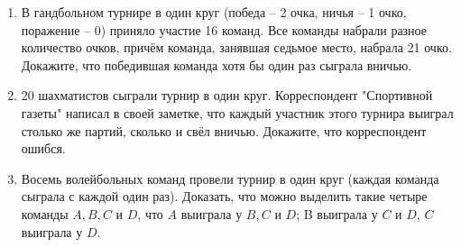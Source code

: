 \documentclass{article}
\begin{document}
\begin{enumerate}[label*=\protect\fbox{\arabic{enumi}}]
	\item В гандбольном турнире в один круг (победа – 2 очка, ничья – 1 очко, поражение – 0) приняло участие 16 команд. Все команды набрали разное количество очков, причём команда, занявшая седьмое место, набрала 21 очко. Докажите, что победившая команда хотя бы один раз сыграла вничью.
	
	\item 20 шахматистов сыграли турнир в один круг. Корреспондент "Спортивной газеты" написал в своей заметке, что каждый участник этого турнира выиграл столько же партий, сколько и свёл вничью. Докажите, что корреспондент ошибся.
	
	\item Восемь волейбольных команд провели турнир в один круг (каждая команда сыграла с каждой один раз). Доказать, что можно выделить такие четыре команды $A, B, C$ и $D$, что $A$ выиграла у $B, C$ и $D$; B выиграла у $C$ и $D$, $C$ выиграла у $D$.

\end{enumerate}
\end{document}
